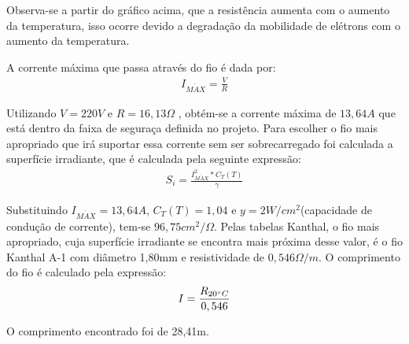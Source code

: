 Observa-se a partir do gráfico acima, que a resistência aumenta com o aumento da temperatura, isso ocorre devido a degradação da  mobilidade de elétrons com o aumento da temperatura.

A corrente máxima que passa através do fio é dada por:
\begin{gather}
    I_{M\acute{A}X} = \frac{V}{R}
\end{gather}

Utilizando $V=220V$ e $R=16,13\Omega$ , obtém-se a corrente máxima de $13,64 A$ que está dentro da faixa de seguraça definida no projeto. Para escolher o fio mais apropriado que irá suportar essa corrente sem ser sobrecarregado foi calculada a superfície irradiante, que é calculada pela seguinte expressão:
\begin{gather}
    S_i = \frac{I_{M\acute{A}X}^{2}*C_T(T)}{\gamma}
\end{gather}

Substituindo $I_{M\acute{A}X}=13,64A$, $C_T(T)=1,04$ e $y=2W/cm^{2}$(capacidade de condução de corrente), tem-se $96,75 cm^{2} / \Omega$. Pelas tabelas Kanthal, o fio mais apropriado, cuja superfície irradiante se encontra mais próxima desse valor, é o fio Kanthal A-1 com diâmetro 1,80mm e resistividade de $0,546\Omega /m$. O comprimento do fio é calculado pela expressão:
\begin{gather}
    I = \frac{R_{20 \degree C}}{0,546}
\end{gather}

O comprimento encontrado foi de 28,41m.

